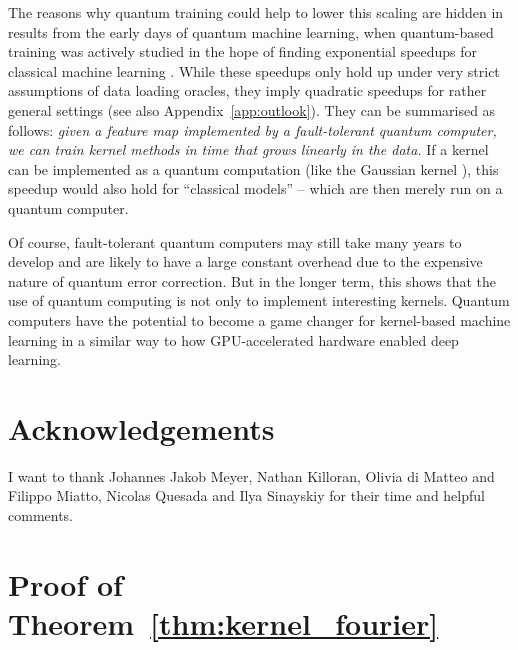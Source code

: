 \documentclass[aps, reprint, onecolumn, nofootinbib, longbibliography]{revtex4-2}
\begin{document}
The reasons why quantum training could help to lower this scaling are hidden in results from the early days of quantum machine learning, when quantum-based training was actively studied in the hope of finding exponential speedups for classical machine learning \citep{wiebe2012quantum, rebentrost2014quantum, lloyd2014quantum}. While these speedups only hold up under very strict assumptions of data loading oracles, they imply quadratic speedups for rather general settings (see also Appendix~\ref{app:outlook}). They can be summarised as follows: \textit{given a feature map implemented by a fault-tolerant quantum computer, we can train kernel methods in time that grows linearly in the data. } If a kernel can be implemented as a quantum computation (like the Gaussian kernel \citep{chatterjee2016generalized}), this speedup would also hold for ``classical models'' -- which are then merely run on a quantum computer. 
 
Of course, fault-tolerant quantum computers may still take many years to develop and are likely to have a large constant overhead due to the expensive nature of quantum error correction. But in the longer term, this shows that the use of quantum computing is not only to implement interesting kernels. Quantum computers have the potential to become a game changer for kernel-based machine learning in a similar way to how GPU-accelerated hardware enabled deep learning.



\section*{Acknowledgements}
I want to thank Johannes Jakob Meyer, Nathan Killoran, Olivia di Matteo and Filippo Miatto, Nicolas Quesada and Ilya Sinayskiy for their time and helpful comments.

%



\appendix



\section{Proof of Theorem~\ref{thm:kernel_fourier}} \label{app:fourier_proof}
\end{document}
